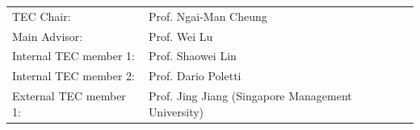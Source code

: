 \documentclass[
11pt, %
oneside, %
english, %
singlespacing, %
headsepline, %
]{MastersDoctoralThesis} %
\begin{document}

\begin{tec}
\addchaptertocentry{\tecname}
\begin{tabular}{ll}
	TEC Chair: & Prof. Ngai-Man Cheung \\
	Main Advisor: & Prof. Wei Lu \\
	Internal TEC member 1: & Prof. Shaowei Lin \\
	Internal TEC member 2: & Prof. Dario Poletti \\
	External TEC member 1: & Prof. Jing Jiang (Singapore Management University) \\
\end{tabular}
\end{tec}
\vfill\eject

\end{document}
